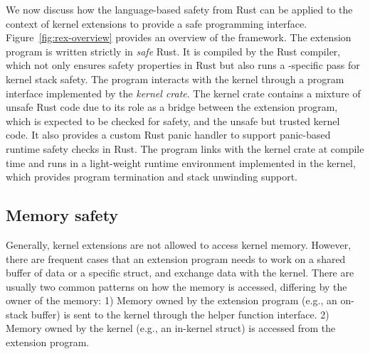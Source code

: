 We now discuss how the language-based safety from Rust can be applied to the
    context of kernel extensions to provide a safe programming interface.
Figure~\ref{fig:rex-overview} provides an overview of the \projname{} framework.
The extension program is written strictly in \emph{safe} Rust.
It is compiled by the Rust compiler, which not only ensures safety properties
    in Rust but also runs a \projname{}-specific pass for kernel stack safety.
The program interacts with the kernel through a program interface implemented
    by the \projname{} \emph{kernel crate}.
The kernel crate contains a mixture of unsafe Rust code due to its role as a
    bridge between the extension program, which is expected to be checked for
    safety, and the unsafe but trusted kernel code.
It also provides a custom Rust panic handler to support panic-based runtime
    safety checks in Rust.
The program links with the kernel crate at compile time and runs in a
    light-weight runtime environment implemented in the kernel, which provides
    program termination and stack unwinding support.

\subsection{Memory safety}
\label{principle:memsafety}
Generally, kernel extensions are not allowed to access kernel memory.
However, there are frequent cases that an extension program needs to work on a
    shared buffer of data or a specific struct, and exchange data with the
    kernel.
There are usually two common patterns on how the memory is accessed, differing
    by the owner of the memory: 1) Memory owned by the extension program (e.g.,
    an on-stack buffer) is sent to the kernel through the helper function
    interface. 2) Memory owned by the kernel (e.g., an in-kernel struct) is
    accessed from the extension program. %

